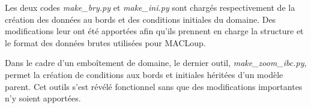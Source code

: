 \documentclass[10pt,a4paper,titlepage]{article}
\begin{document}
Les deux codes \textit{make\_bry.py} et \textit{make\_ini.py} sont chargés respectivement de la création des données au bords et des conditions initiales du domaine.
Des modifications leur ont été apportées afin qu'ils prennent en charge la structure et le format des données brutes utilisées pour MACLoup.

Dans le cadre d'un emboîtement de domaine, le dernier outil, \textit{make\_zoom\_ibc.py}, permet la création de conditions aux bords et initiales héritées d'un modèle parent.
Cet outils s'est révélé fonctionnel sans que des modifications importantes n'y soient apportées.















\end{document}
